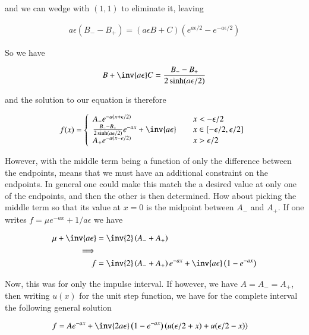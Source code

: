 \documentclass{article}
\begin{document}
and we can wedge with $(1,1)$ to eliminate it, leaving

\begin{align*}
a \epsilon
(B_{-} - B_{+})
=
\left(a \epsilon B + C \right) 
(e^{a \epsilon/2} - e^{-a \epsilon/2})
\end{align*}

So we have

\begin{align*}
B + \inv{a \epsilon}C = \frac{B_{-} - B_{+}}{2 \sinh(a \epsilon/2)}
\end{align*}

and the solution to our equation is therefore

\begin{align*}
f(x) = 
\left\{
\begin{array}{l l}
A_{-} e^{-a(x + \epsilon/2)} & \quad x < -\epsilon/2 \\
\frac{B_{-} - B_{+}}{2 \sinh(a \epsilon/2)} e^{-ax} + \inv{a \epsilon} & \quad x \in \left[-\epsilon/2, \epsilon/2 \right] \\
A_{+} e^{-a(x - \epsilon/2)} & \quad x > \epsilon/2 \\
\end{array} \right.
\end{align*}

However, with the middle term being a function of only the difference between the endpoints, means that we must have an additional constraint on the endpoints.  In general one could make this match the a desired value at only one of the endpoints, and then the other is then determined.  How about picking the middle term so that its 
value at $x=0$ is the midpoint between $A_{-}$ and $A_{+}$.  If one writes $f = \mu e^{-ax} + 1/a \epsilon$ we have

\begin{align*}
\mu + \inv{a\epsilon} &= \inv{2}\left(A_{-} + A_{+}\right) \\
\implies \\
f &= \inv{2}\left(A_{-} + A_{+}\right) e^{-ax} + \inv{a \epsilon} \left(1 - e^{-a x}\right)
\end{align*}

Now, this was for only the impulse interval.  If however, we have $A = A_{-} = A_{+}$, then writing $u(x)$ for the unit step function, we have for the complete interval the following general solution

\begin{align*}
f &= A e^{-ax} + \inv{2 a \epsilon} \left(1 - e^{-a x}\right)\left( u(\epsilon/2 + x) + u(\epsilon/2 -x)\right)
\end{align*}
\end{document}
